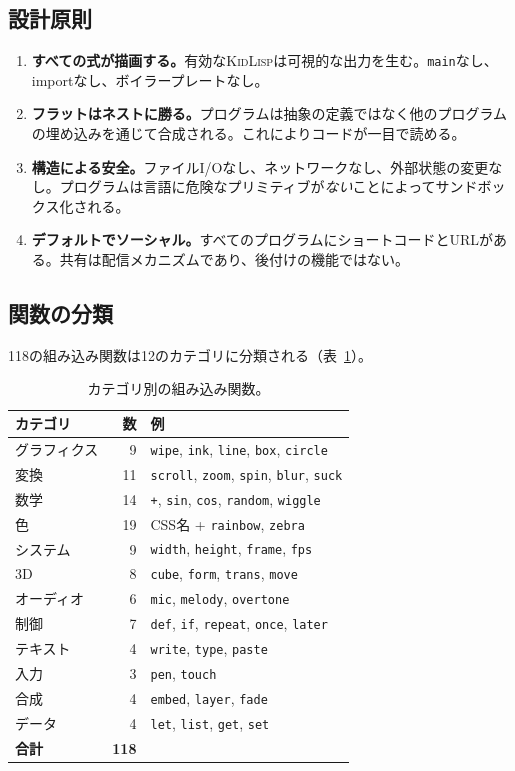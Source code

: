 \documentclass[10pt,letterpaper,twocolumn]{article}
\newcommand{\kidlisp}{\textsc{KidLisp}}
\begin{document}
\subsection{設計原則}

\begin{enumerate}
  \item \textbf{すべての式が描画する。}有効な\kidlisp{}は可視的な出力を生む。\texttt{main}なし、importなし、ボイラープレートなし。
  \item \textbf{フラットはネストに勝る。}プログラムは抽象の定義ではなく他のプログラムの埋め込みを通じて合成される。これによりコードが一目で読める。
  \item \textbf{構造による安全。}ファイルI/Oなし、ネットワークなし、外部状態の変更なし。プログラムは言語に危険なプリミティブが\emph{ない}ことによってサンドボックス化される。
  \item \textbf{デフォルトでソーシャル。}すべてのプログラムにショートコードとURLがある。共有は配信メカニズムであり、後付けの機能ではない。
\end{enumerate}

\subsection{関数の分類}

118の組み込み関数は12のカテゴリに分類される（表~\ref{tab:functions}）。

\begin{table}[h]
\small
\centering
\begin{tabularx}{\columnwidth}{lrX}
\toprule
\textbf{カテゴリ} & \textbf{数} & \textbf{例} \\
\midrule
グラフィクス & 9 & \texttt{wipe}, \texttt{ink}, \texttt{line}, \texttt{box}, \texttt{circle} \\
変換 & 11 & \texttt{scroll}, \texttt{zoom}, \texttt{spin}, \texttt{blur}, \texttt{suck} \\
数学 & 14 & \texttt{+}, \texttt{sin}, \texttt{cos}, \texttt{random}, \texttt{wiggle} \\
色 & 19 & CSS名 + \texttt{rainbow}, \texttt{zebra} \\
システム & 9 & \texttt{width}, \texttt{height}, \texttt{frame}, \texttt{fps} \\
3D & 8 & \texttt{cube}, \texttt{form}, \texttt{trans}, \texttt{move} \\
オーディオ & 6 & \texttt{mic}, \texttt{melody}, \texttt{overtone} \\
制御 & 7 & \texttt{def}, \texttt{if}, \texttt{repeat}, \texttt{once}, \texttt{later} \\
テキスト & 4 & \texttt{write}, \texttt{type}, \texttt{paste} \\
入力 & 3 & \texttt{pen}, \texttt{touch} \\
合成 & 4 & \texttt{embed}, \texttt{layer}, \texttt{fade} \\
データ & 4 & \texttt{let}, \texttt{list}, \texttt{get}, \texttt{set} \\
\midrule
\textbf{合計} & \textbf{118} & \\
\bottomrule
\end{tabularx}
\caption{カテゴリ別の組み込み関数。}
\label{tab:functions}
\end{table}
\end{document}

